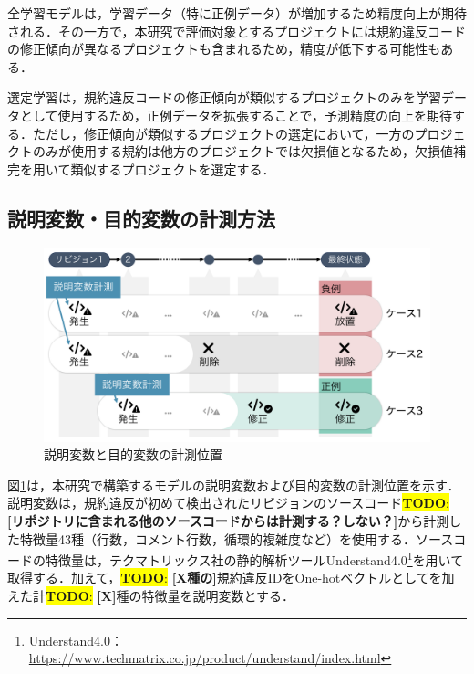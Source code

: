 \documentclass[submit]{ipsj}
\newcommand{\todo}[1]{\colorbox{yellow}{{\bf TODO}:}{\color{red} {\textbf{[#1]}}}}
\begin{document}
全学習モデルは，学習データ（特に正例データ）が増加するため精度向上が期待される．その一方で，本研究で評価対象とするプロジェクトには規約違反コードの修正傾向が異なるプロジェクトも含まれるため，精度が低下する可能性もある．


選定学習は，規約違反コードの修正傾向が類似するプロジェクトのみを学習データとして使用するため，正例データを拡張することで，予測精度の向上を期待する．ただし，修正傾向が類似するプロジェクトの選定において，一方のプロジェクトのみが使用する規約は他方のプロジェクトでは欠損値となるため，欠損値補完を用いて類似するプロジェクトを選定する．





\subsection{説明変数・目的変数の計測方法}

\begin{figure}[t]
    \centering
    \includegraphics[width=1.0\linewidth]{fig/kameoka_fig2.pdf}
    \caption{説明変数と目的変数の計測位置}
    \label{fig:mokutekihensu}
\end{figure}

図\ref{fig:mokutekihensu}は，本研究で構築するモデルの説明変数および目的変数の計測位置を示す．
説明変数は，規約違反が初めて検出されたリビジョンのソースコード\todo{リポジトリに含まれる他のソースコードからは計測する？しない？}から計測した特徴量43種（行数，コメント行数，循環的複雑度など）を使用する．ソースコードの特徴量は，テクマトリックス社の静的解析ツールUnderstand4.0\footnote{Understand4.0：\url{https://www.techmatrix.co.jp/product/understand/index.html}}を用いて取得する．加えて，\todo{X種の}規約違反IDをOne-hotベクトルとしてを加えた計\todo{X}種の特徴量を説明変数とする．
\end{document}
